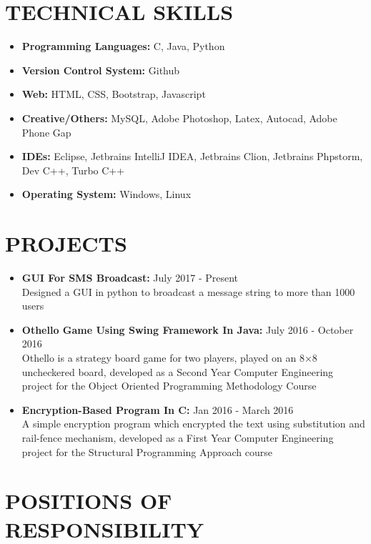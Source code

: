 \documentclass[11pt]{article} %
\newcommand{\NewPart}[1]{\section*{\uppercase{#1}}}
\begin{document}
\NewPart{    Technical Skills}{}

\vspace{0pt}

\begin{itemize}
\itemsep-0.5em 
\item \textbf{Programming Languages:} C, Java, Python

\item \textbf{Version Control System:} Github
\vspace{0pt}

\item \textbf{Web:} HTML, CSS, Bootstrap, Javascript
\item \textbf{Creative/Others:} MySQL, Adobe Photoshop, Latex, Autocad, Adobe Phone Gap

\item \textbf{IDEs:}  Eclipse, Jetbrains IntelliJ IDEA, Jetbrains Clion, Jetbrains Phpstorm, Dev C++, Turbo C++

\item \textbf{Operating System:} Windows, Linux

\end{itemize}



\NewPart{    Projects}{}
\begin{itemize}
\itemsep-0.5em
\item \textbf{GUI For SMS Broadcast: }\hfill {July 2017 - Present}
\\Designed a GUI in python to broadcast a message string to more than 1000 users
\item \textbf{Othello Game Using Swing Framework In Java: }\hfill {July 2016 - October 2016}
\\Othello is a strategy board game for two players, played on an 8×8 uncheckered board, developed as a Second Year Computer Engineering project for the Object Oriented Programming Methodology Course 
\item \textbf{Encryption-Based Program In C: }\hfill {Jan 2016 - March 2016}\\A simple encryption program which encrypted the text using substitution and rail-fence mechanism, developed as a First Year Computer Engineering project for the Structural Programming Approach course
\end{itemize}




\NewPart{  Positions of Responsibility}{}
\end{document}

